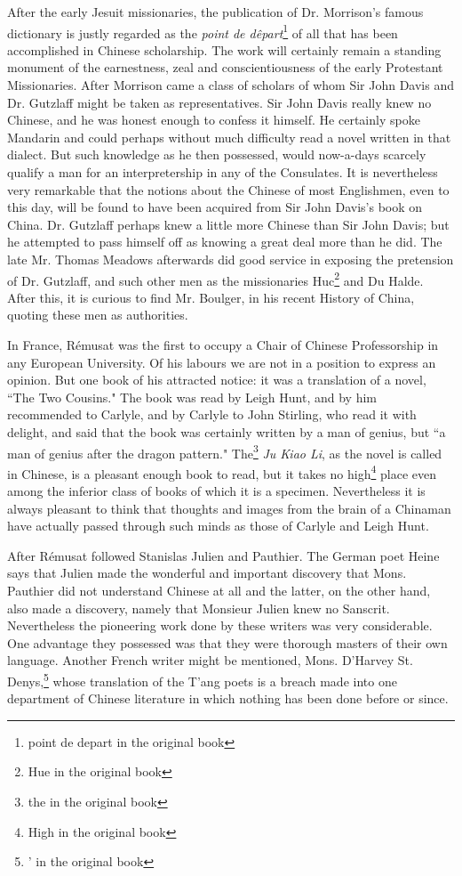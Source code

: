 After the early Jesuit missionaries, the publication of Dr. Morrison's famous dictionary is justly regarded as the \emph{point de d\^epart}\footnote{point de depart in the original book} of all that has been accomplished in Chinese scholarship.
The work will certainly remain a standing monument of the earnestness, zeal and conscientiousness of the early Protestant Missionaries.
After Morrison came a class of scholars of whom Sir John Davis and Dr. Gutzlaff might be taken as representatives.
Sir John Davis really knew no Chinese, and he was honest enough to confess it himself.
He certainly spoke Mandarin and could perhaps without much difficulty read a novel written in that dialect.
But such knowledge as he then possessed, would now-a-days scarcely qualify a man for an interpretership in any of the Consulates.
It is nevertheless very remarkable that the notions about the Chinese of most Englishmen, even to this day, will be found to have been acquired from Sir John Davis's book on China.
Dr. Gutzlaff perhaps knew a little more Chinese than Sir John Davis; but he attempted to pass himself off as knowing a great deal more than he did.
The late Mr. Thomas Meadows afterwards did good service in exposing the pretension of Dr. Gutzlaff, and such other men as the missionaries Huc\footnote{Hue in the original book} and Du Halde. 
After this, it is curious to find Mr. Boulger, in his recent History of China, quoting these men as authorities.

In France, R\'emusat was the first to occupy a Chair of Chinese Professorship in any European University.
Of his labours we are not in a position to express an opinion.
But one book of his attracted notice: it was a translation of a novel, ``The Two Cousins."
The book was read by Leigh Hunt, and by him recommended to Carlyle, and by Carlyle to John Stirling, who read it with delight, and said that the book was certainly written by a man of genius, but ``a man of genius after the dragon pattern."
The\footnote{the in the original book} \emph{Ju Kiao Li}, as the novel is called in Chinese, is a pleasant enough book to read, but it takes no high\footnote{High in the original book} place even among the inferior class of books of which it is a specimen.
Nevertheless it is always pleasant to think that thoughts and images from the brain of a Chinaman have actually passed through such minds as those of Carlyle and Leigh Hunt.

After R\'emusat followed Stanislas Julien and Pauthier.
The German poet Heine says that Julien made the wonderful and important discovery that Mons. Pauthier did not understand Chinese at all and the latter, on the other hand, also made a discovery, namely that Monsieur Julien knew no Sanscrit.
Nevertheless the pioneering work done by these writers was very considerable.
One advantage they possessed was that they were thorough masters of their own language.
Another French writer might be mentioned, Mons. D'Harvey St. Denys,\footnote{' in the original book} whose translation of the T'ang poets is a breach made into one department of Chinese literature in which nothing has been done before or since.

